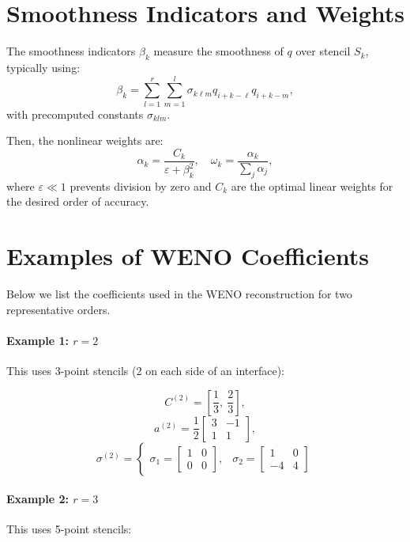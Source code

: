 \documentclass{article}
\begin{document}
\section*{Smoothness Indicators and Weights}

The smoothness indicators $\beta_k$ measure the smoothness of $q$ over stencil $S_k$, typically using:
\[
\beta_k = \sum_{l=1}^r \sum_{m=1}^l \sigma_{k\ell m} q_{i+k-\ell} q_{i+k-m},
\]
with precomputed constants $\sigma_{klm}$.

Then, the nonlinear weights are:
\[
\alpha_k = \frac{C_k}{\varepsilon + \beta_k^2}, \quad
\omega_k = \frac{\alpha_k}{\sum_j \alpha_j},
\]
where $\varepsilon \ll 1$ prevents division by zero and $C_k$ are the optimal linear weights for the desired order of accuracy.

\section*{Examples of WENO Coefficients}

Below we list the coefficients used in the WENO reconstruction for two representative orders.

\paragraph{Example 1: \( r = 2 \)} 
This uses 3-point stencils (2 on each side of an interface):

\[
C^{(2)} = \left[ \frac{1}{3},\ \frac{2}{3} \right],
\]
\[
a^{(2)} = \frac{1}{2}
\begin{bmatrix}
3 & -1 \\
1 & 1
\end{bmatrix},
\]
\[
\sigma^{(2)} = 
\left\{
\begin{array}{ll}
\sigma_1 =
\begin{bmatrix}
1 & 0 \\
0 & 0
\end{bmatrix},
& 
\sigma_2 =
\begin{bmatrix}
1 & 0 \\
-4 & 4
\end{bmatrix}
\end{array}
\right.
\]

\paragraph{Example 2: \( r = 3 \)} 
This uses 5-point stencils:
\end{document}
